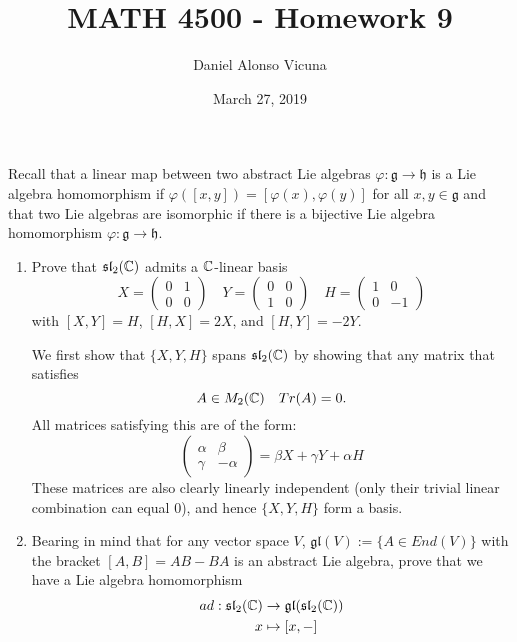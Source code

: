 \documentclass[12pt,onecolumn]{article}
\title{MATH 4500 - Homework 9}
\author{Daniel Alonso Vicuna}
\date{March 27, 2019}
\begin{document}
\maketitle
\begin{exercise}
Recall that a linear map between two abstract Lie algebras $\varphi : \mathfrak{g} \rightarrow \mathfrak{h}$ is a Lie algebra homomorphism if $\varphi([x, y]) =
[\varphi(x), \varphi(y)]$ for all $x, y \in \mathfrak{g}$ and that two Lie algebras are isomorphic if there is a bijective Lie algebra homomorphism $\varphi : \mathfrak{g} \rightarrow \mathfrak{h}$.
\begin{enumerate}[label=(\alph*)]
    \item Prove that $\mathfrak{sl}_2(\operatorname{\mathbb{C}})$ admits a $\operatorname{\mathbb{C}}$-linear basis 
    \[
    X = \begin{pmatrix}0 & 1 \\ 0 & 0 \end{pmatrix}
    \quad 
    Y = \begin{pmatrix}0 & 0 \\ 1 & 0 \end{pmatrix}
    \quad 
    H = \begin{pmatrix}1 & 0 \\ 0 & -1 \end{pmatrix}
    \]
    with $[X,Y]=H$, $[H,X]=2X$, and $[H,Y]=-2Y$.
    \begin{answer}
    We first show that $\{X,Y,H\}$ spans $\mathfrak{sl}_2(\operatorname{\mathbb{C}})$ by showing that any matrix that satisfies 
    \[
    A \in M_2(\operatorname{\mathbb{C}}) \quad Tr(A) = 0.
    \]
    All matrices satisfying this are of the form:
    \[
    \begin{pmatrix} 
    \alpha & \beta \\
    \gamma & -\alpha
    \end{pmatrix}
    = \beta X + \gamma Y + \alpha H
    \]
    These matrices are also clearly linearly independent (only their trivial linear combination can equal 0), and hence $\{X,Y,H\}$ form a basis.
    \end{answer}
    \item Bearing in mind that for any vector space $V$, $\mathfrak{gl}(V):= \{A \in End(V )\}$ with the bracket $[A, B] = AB - BA$ is an abstract Lie algebra, prove that we have a Lie algebra homomorphism
    \begin{align*}
    ad : \mathfrak{sl}_2(\operatorname{\mathbb{C}}) &\rightarrow \mathfrak{gl}(\mathfrak{sl}_2(\operatorname{\mathbb{C}})) \\
    x &\mapsto [x,-]
    \end{align*}

\end{enumerate}
\end{exercise}
\end{document}
